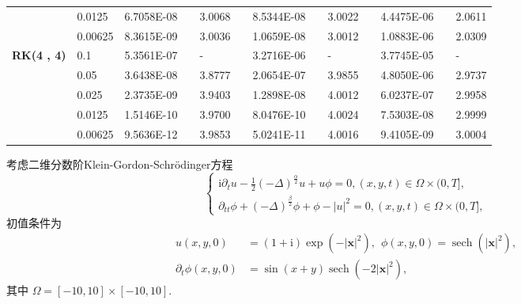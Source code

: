 \begin{table}[H]
\begin{tabular}{lllllrlrlrlrlrl}
	\multicolumn{2}{l}{} & \multicolumn{2}{l}{0.0125} & 6.7058E-08 &       & 3.0068  &       & 8.5344E-08 &       & 3.0022  &       & 4.4475E-06 &       & 2.0611  \\
	\multicolumn{2}{l}{} & \multicolumn{2}{l}{0.00625} & 8.3615E-09 &       & 3.0036  &       & 1.0659E-08 &       & 3.0012  &       & 1.0883E-06 &       & 2.0309  \\
	\multicolumn{2}{l}{\multirow{5}[1]{*}{\textbf{RK(4 , 4)}}} & \multicolumn{2}{l}{0.1} & 5.3561E-07 &       & -     &       & 3.2716E-06 &       & -     &       & 3.7745E-05 &       & - \\
	\multicolumn{2}{l}{} & \multicolumn{2}{l}{0.05} & 3.6438E-08 &       & 3.8777  &       & 2.0654E-07 &       & 3.9855  &       & 4.8050E-06 &       & 2.9737  \\
	\multicolumn{2}{l}{} & \multicolumn{2}{l}{0.025} & 2.3735E-09 &       & 3.9403  &       & 1.2898E-08 &       & 4.0012  &       & 6.0237E-07 &       & 2.9958  \\
	\multicolumn{2}{l}{} & \multicolumn{2}{l}{0.0125} & 1.5146E-10 &       & 3.9700  &       & 8.0476E-10 &       & 4.0024  &       & 7.5303E-08 &       & 2.9999  \\
	\multicolumn{2}{l}{} & \multicolumn{2}{l}{0.00625} & 9.5636E-12 &       & 3.9853  &       & 5.0241E-11 &       & 4.0016  &       & 9.4105E-09 &       & 3.0004  \\
	\bottomrule
	\end{tabular}%
	\label{tab_SAVRRK:6-3}%
	\end{table}%
	
\begin{example}\label{exp_SAVRRK:4}
考虑二维分数阶Klein-Gordon-Schr{\"o}dinger方程\cite{fuStructurepreservingAlgorithmsTwodimensional2020}
\begin{equation}
\begin{cases}
\mathrm{i} \partial_t u-\frac{1}{2}(-\Delta)^{\frac{\alpha}{2}} u+u \phi=0 , (x , y , t) \in \Omega \times(0 , T] , \\
\partial_{t t} \phi+(-\Delta)^{\frac{\beta}{2}} \phi+\phi-|u|^2=0 , (x , y , t) \in \Omega \times(0 , T] , 
\end{cases}
\end{equation}
初值条件为
\begin{equation}
	\begin{aligned}
		u(x , y , 0)&=(1+\mathrm{i}) \exp \left(-|\boldsymbol{x}|^2\right) , ~~\phi(x , y , 0)=\operatorname{sech}\left(|\boldsymbol{x}|^2\right) , \\
		\partial_t \phi(x , y , 0)&=\sin (x+y) \operatorname{sech}\left(-2|\boldsymbol{x}|^2\right) , 
	\end{aligned}
\end{equation}
其中 $\Omega=[-10 , 10] \times[-10 , 10]$.
\end{example}

